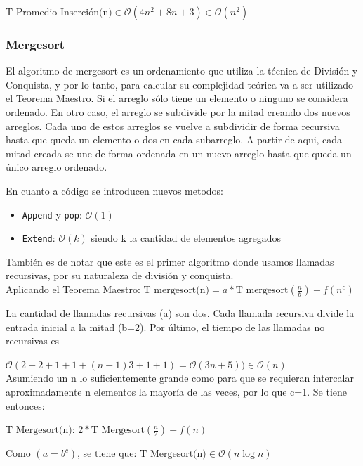 \documentclass[article,a4paper]{article}
\begin{document}
$\mbox{T Promedio Inserción(n)} \in \mathcal O(4n^2 + 8n + 3) \in \mathcal O(n^2)$

\subsubsection{Mergesort}

El algoritmo de mergesort es un ordenamiento que utiliza la técnica de División y Conquista, y por lo tanto, para calcular su complejidad teórica va a ser utilizado el Teorema Maestro. Si el arreglo sólo tiene un elemento o ninguno se considera ordenado. En otro caso, el arreglo se subdivide por la mitad creando dos nuevos arreglos. Cada uno de estos arreglos se vuelve a subdividir de forma recursiva hasta que queda un elemento o dos en cada subarreglo. A partir de aqui, cada mitad creada se une de forma ordenada en un nuevo arreglo hasta que queda un único arreglo ordenado.

En cuanto a código se introducen nuevos metodos:

\begin{itemize}
\item \texttt{Append} y \texttt{pop}: $\mathcal O(1)$
\item \texttt{Extend}: $\mathcal O(k)$ siendo k la cantidad de elementos agregados 
\end{itemize}

También es de notar que este es el primer algoritmo donde usamos llamadas recursivas, por su naturaleza de división y conquista.\\

Aplicando el Teorema Maestro: $\mbox{T mergesort(n)} = a * \mbox{T mergesort}(\frac{n}{b}) + f(n^c)$

La cantidad de llamadas recursivas (a) son dos. Cada llamada recursiva divide la entrada inicial a la mitad (b=2). Por último, el tiempo de las llamadas no recursivas es 

$\mathcal O(2 + 2 + 1 + 1 + (n-1) 3 + 1 + 1) = \mathcal O(3n + 5)) \in \mathcal O(n)$\\

Asumiendo un n lo suficientemente grande como para que se requieran intercalar aproximadamente n elementos la mayoría de las veces, por lo que c=1. Se tiene entonces:

$\mbox{T Mergesort(n): } 2 * \mbox{T Mergesort} (\frac{n}{2}) + f(n)$

Como $(a = b^c)$, se tiene que: $\mbox{T Mergesort(n)} \in \mathcal O(n \log n)$
\end{document}
